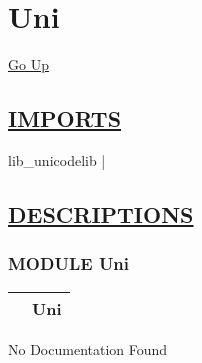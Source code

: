 \chapter*{\color{headfile}
Uni
}
\hypertarget{ecldoc:toc:Uni}{}
\hyperlink{ecldoc:toc:root}{Go Up}

\section*{\underline{\textsf{IMPORTS}}}
\begin{doublespace}
{\large
lib\_unicodelib |
}
\end{doublespace}

\section*{\underline{\textsf{DESCRIPTIONS}}}
\subsection*{\textsf{\colorbox{headtoc}{\color{white} MODULE}
Uni}}

\hypertarget{ecldoc:Uni}{}

{\renewcommand{\arraystretch}{1.5}
\begin{tabularx}{\textwidth}{|>{\raggedright\arraybackslash}l|X|}
\hline
\hspace{0pt}\mytexttt{\color{red} } & \textbf{Uni} \\
\hline
\end{tabularx}
}

\par





No Documentation Found







